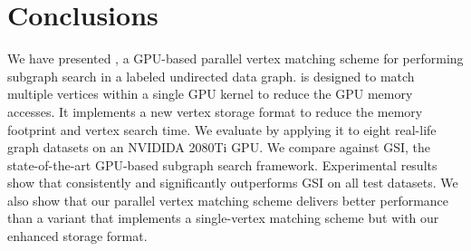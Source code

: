 
\section{Conclusions}
We have presented \SystemName, a GPU-based parallel vertex matching scheme for performing subgraph search in a labeled undirected data
graph. \SystemName is designed to match multiple vertices within a single GPU kernel to reduce the GPU memory accesses. It implements a new
vertex storage format to reduce the memory footprint and vertex search time. We evaluate \SystemName by applying it to eight real-life
graph datasets on an NVIDIDA 2080Ti GPU. We compare \SystemName against GSI, the state-of-the-art GPU-based subgraph search framework.
Experimental results show that \SystemName consistently and significantly outperforms GSI on all test datasets. We also show that our
parallel vertex matching scheme delivers better performance than a variant that implements a single-vertex matching scheme but with our
enhanced storage format.
